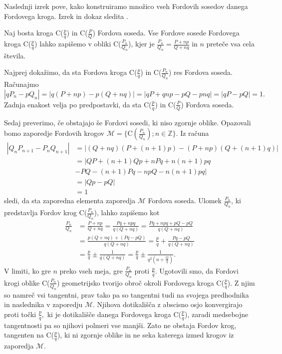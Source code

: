 \documentclass[mat1]{fmfdelo}
\newcommand{\Z}{\mathbb Z}
\begin{document}
Naslednji izrek pove, kako konstruiramo množico vseh Fordovih sosedov danega Fordovega kroga. Izrek in dokaz sledita \cite[trditev 3]{ford}.

\begin{izrek}
Naj bosta kroga C($\frac{p}{q}$) in C($\frac{P}{Q}$) Fordova soseda. Vse Fordove sosede Fordovega kroga C($\frac{p}{q}$) lahko zapišemo v obliki C($\frac{P_n}{Q_n}$), kjer je $\frac{P_n}{Q_n} = \frac{P+np}{Q+nq}$ in $n$ preteče vsa cela števila.
\end{izrek}

\begin{dokaz}
%
Najprej dokažimo, da sta Fordova kroga C($\frac{p}{q}$) in C($\frac{P_n}{Q_n}$) res Fordova soseda. Računajmo
\[ |qP_{n} - pQ_{n}| = |q(P+np) - p(Q+nq)| = |qP+qnp-pQ-pnq| = |qP-pQ| = 1. \]
Zadnja enakost velja po predpostavki, da sta C($\frac{p}{q}$) in C($\frac{P}{Q}$) Fordova soseda.

Sedaj preverimo, če obstajajo še Fordovi sosedi, ki niso zgornje oblike. Opazovali bomo zaporedje Fordovih krogov $\mathcal{M} = \{ \mathrm{C}(\frac{P_n}{Q_n}); n\in\Z \}.$
Iz računa
\begin{align}
|Q_{n}P_{n+1} - P_{n}Q_{n+1}| 
  &= |(Q+nq)(P+(n+1)p) - (P+np)(Q+(n+1)q)| \nonumber \\ 
  &= |QP + (n+1)Qp + nPq + n(n+1)pq \nonumber \\
  &   - PQ - (n+1)Pq - npQ - n(n+1)pq| \nonumber \\
  &= |Qp - pQ| \nonumber \\
  &= 1
\end{align}
sledi, da sta zaporedna elementa zaporedja $\mathcal{M}$ Fordova soseda. Ulomek $\frac{P_n}{Q_n}$, ki predstavlja Fordov krog C($\frac{P_n}{Q_n}$), lahko zapišemo kot
\begin{align}
\frac{P_n}{Q_n}
  &= \frac{P+np}{Q+nq} = \frac{Pq+npq}{q(Q+nq)} = \frac{Pq+npq+pQ-pQ}{q(Q+nq)} \nonumber \\
  &= \frac{p(Q+nq) + (Pq-pQ)}{q(Q+nq)} = \frac{p}{q} + \frac{Pq-pQ}{q(Q+nq)} \nonumber \\
  &= \frac{p}{q} \pm \frac{1}{q(Q+nq)} = \frac{p}{q} \pm \frac{1}{q^2 \left (n+\frac{Q}{q} \right)}.
\end{align}
%
V limiti, ko gre $n$ preko vseh meja, gre $\frac{P_n}{Q_n}$ proti $\frac{p}{q}.$
Ugotovili smo, da Fordovi krogi oblike C($\frac{P_n}{Q_n}$) geometrijsko tvorijo obroč okroli Fordovega kroga C($\frac{p}{q}$). Z njim so namreč vsi tangentni, prav tako pa so tangentni tudi na svojega predhodnika in naslednika v zaporedju $\mathcal{M}$. Njihova dotikališča z abscisno osjo konvergirajo proti točki $\frac{p}{q},$ ki je dotikališče danega Fordovega kroga C($\frac{p}{q}$), zaradi medsebojne tangentnosti pa so njihovi polmeri vse manjši. Zato ne obstaja Fordov krog, tangenten na C($\frac{p}{q}$), ki ni zgornje oblike in ne seka katerega izmed krogov iz zaporedja $\mathcal{M}$.
%
\end{dokaz}
\end{document}
